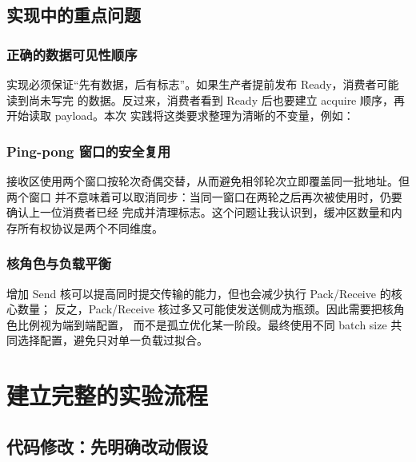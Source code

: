 \documentclass[UTF8,a4paper,11pt]{ctexart}
\begin{document}
\subsection{实现中的重点问题}

\subsubsection{正确的数据可见性顺序}

实现必须保证“先有数据，后有标志”。如果生产者提前发布 Ready，消费者可能读到尚未写完
的数据。反过来，消费者看到 Ready 后也要建立 acquire 顺序，再开始读取 payload。本次
实践将这类要求整理为清晰的不变量，例如：

\begin{center}
\end{center}

\subsubsection{Ping-pong 窗口的安全复用}

接收区使用两个窗口按轮次奇偶交替，从而避免相邻轮次立即覆盖同一批地址。但两个窗口
并不意味着可以取消同步：当同一窗口在两轮之后再次被使用时，仍要确认上一位消费者已经
完成并清理标志。这个问题让我认识到，缓冲区数量和内存所有权协议是两个不同维度。

\subsubsection{核角色与负载平衡}

增加 Send 核可以提高同时提交传输的能力，但也会减少执行 Pack/Receive 的核心数量；
反之，Pack/Receive 核过多又可能使发送侧成为瓶颈。因此需要把核角色比例视为端到端配置，
而不是孤立优化某一阶段。最终使用不同 batch size 共同选择配置，避免只对单一负载过拟合。

\section{建立完整的实验流程}

\subsection{代码修改：先明确改动假设}
\end{document}

